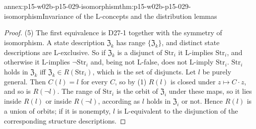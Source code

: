 \begin{annexitem}{annex:p15-w02b-p15-029-isomorphism}{thm:p15-w02b-p15-029-isomorphism}{Invariance of the L-concepts and the distribution lemmas}
\begin{proof}
(5) The first equivalence is D27-1 together with the symmetry of
isomorphism. A state description \(\mathfrak Z_k\) has range
\(\{\mathfrak Z_k\}\), and distinct state descriptions are
L-exclusive. So if \(\mathfrak Z_k\) is a disjunct of
\(\mathrm{Str}_i\) it L-implies \(\mathrm{Str}_i\), and otherwise it
L-implies \(\neg\mathrm{Str}_i\) and, being not L-false, does not
L-imply \(\mathrm{Str}_i\). \(\mathrm{Str}_i\) holds in
\(\mathfrak Z_k\) iff \(\mathfrak Z_k\in R(\mathrm{Str}_i)\), which is
the set of disjuncts. Let \(l\) be purely general. Then \(C(l)=l\) for
every \(C\), so by (1) \(R(l)\) is closed under \(z\mapsto C\cdot z\),
and so is \(R(\neg l)\). The range of \(\mathrm{Str}_i\) is the orbit of
\(\mathfrak Z_i\) under these maps, so it lies inside \(R(l)\) or
inside \(R(\neg l)\), according as \(l\) holds in \(\mathfrak Z_i\) or
not. Hence \(R(l)\) is a union of orbits; if it is nonempty, \(l\) is
L-equivalent to the disjunction of the corresponding structure
descriptions.
\end{proof}
\end{annexitem}

